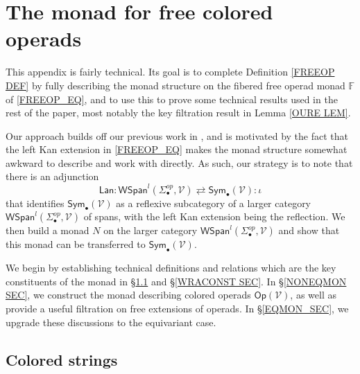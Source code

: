 \documentclass[a4paper,10pt
,draft
]{article}%
\numberwithin{equation}{section}
\numberwithin{figure}{section}
\theoremstyle{definition} %
\newcommand{\Op}{\mathsf{Op}}%
\newcommand{\V}{\ensuremath{\mathcal V}}
\newcommand{\1}{\ensuremath{\mathbbm 1}}%
\begin{document}
\appendix


\section{The monad for free colored operads}
\label{MONAD_APDX}

This appendix is fairly technical.
Its goal is to complete Definition \ref{FREEOP DEF}
by fully describing the monad structure 
on the fibered free operad monad $\mathbb{F}$
of \eqref{FREEOP_EQ},
and to use this to prove some technical results used in the rest of the paper, 
most notably the key filtration result in Lemma \ref{OURE LEM}.


Our approach builds off our previous work in \cite{BP_geo},
and is motivated by the fact that the left Kan extension in \eqref{FREEOP_EQ} makes the monad structure somewhat awkward to describe and work with directly.
As such, our strategy is to note that there is an adjunction 
\begin{equation}\label{SPANSYMADJ EQ}
\mathsf{Lan} \colon
\mathsf{WSpan}^l(\Sigma_{\bullet}^{op},\mathcal{V}) 
	\rightleftarrows
\mathsf{Sym}_{\bullet}(\mathcal{V})
\colon \iota
\end{equation}
that identifies $\mathsf{Sym}_{\bullet}(\V)$ 
as a reflexive subcategory of a larger category 
$\mathsf{WSpan}^l(\Sigma_{\bullet}^{op},\mathcal{V})$
of spans, with the left Kan extension being the reflection.
We then build a monad $N$ on the larger category 
$\mathsf{WSpan}^l(\Sigma_{\bullet}^{op},\mathcal{V})$
and show that this monad can be transferred to 
$\mathsf{Sym}_{\bullet}(\mathcal{V})$.




We begin by establishing technical definitions and relations which are the key constituents of the monad in \S \ref{CSTRINGS_SEC} and \S \ref{WRACONST SEC}.
In \S \ref{NONEQMON SEC}, we construct the monad describing colored operads $\Op(\V)$, as well as provide a useful filtration on free extensions of operads.
In \S \ref{EQMON_SEC}, we upgrade these discussions to the equivariant case.





\subsection{Colored strings}
\label{CSTRINGS_SEC}
\end{document}
